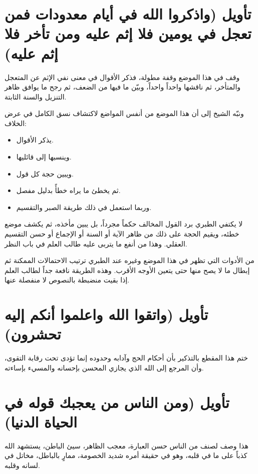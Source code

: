 \section{تأويل (واذكروا الله في أيام معدودات فمن تعجل في يومين فلا إثم عليه ومن تأخر فلا إثم عليه)}
وقف  في هذا الموضع وقفة مطولة، فذكر الأقوال في معنى نفي الإثم عن المتعجل والمتأخر، ثم ناقشها واحداً واحداً، وبيّن ما فيها من الضعف، ثم رجح ما يوافق ظاهر التنزيل والسنة الثابتة.

ونبّه الشيخ إلى أن هذا الموضع من أنفس المواضع لاكتشاف نسق  الكامل في عرض الخلاف:
\begin{itemize}
    \item يذكر الأقوال.
    \item وينسبها إلى قائليها.
    \item ويبين حجة كل قول.
    \item ثم يخطئ ما يراه خطأً بدليل مفصل.
    \item وربما استعمل في ذلك طريقة الصبر والتقسيم.
\end{itemize}

\begin{fawaid}
لا يكتفي الطبري برد القول المخالف حكماً مجرداً، بل يبين مأخذه، ثم يكشف موضع خطئه، ويقيم الحجة على ذلك من ظاهر الآية أو السنة أو الإجماع أو حسن التقسيم العقلي. وهذا من أنفع ما يتربى عليه طالب العلم في باب النظر.
\end{fawaid}

\begin{fawaid}
من الأدوات التي تظهر في هذا الموضع وغيره عند الطبري ترتيب الاحتمالات الممكنة ثم إبطال ما لا يصح منها حتى يتعين الأوجه الأقرب. وهذه الطريقة نافعة جداً لطالب العلم إذا بقيت منضبطة بالنصوص لا منفصلة عنها.
\end{fawaid}

\separator

\section{تأويل (واتقوا الله واعلموا أنكم إليه تحشرون)}
ختم  هذا المقطع بالتذكير بأن أحكام الحج وآدابه وحدوده إنما تؤدى تحت رقابة التقوى، وأن المرجع إلى الله الذي يجازي المحسن بإحسانه والمسيء بإساءته.

\separator

\section{تأويل (ومن الناس من يعجبك قوله في الحياة الدنيا)}
 هذا وصف لصنف من الناس حسن العبارة، معجب الظاهر، سيئ الباطن، يستشهد الله كذباً على ما في قلبه، وهو في حقيقة أمره شديد الخصومة، ممارٍ بالباطل، مخاتل في لسانه وقلبه.

